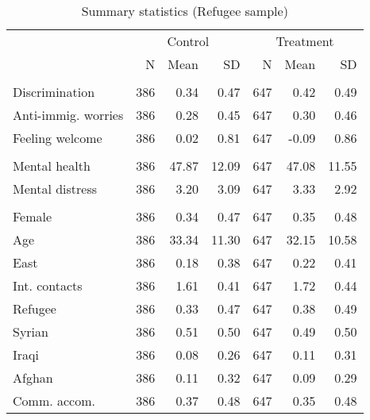 \begin{table}[H]

\caption{Summary statistics (Refugee sample) \label{tab_summary_refugee}}
\centering
\fontsize{10}{12}\selectfont
\begin{tabular}[t]{lrrrrrr}
\toprule
\multicolumn{1}{c}{ } & \multicolumn{3}{c}{Control} & \multicolumn{3}{c}{Treatment} \\
\cmidrule(l{3pt}r{3pt}){2-4} \cmidrule(l{3pt}r{3pt}){5-7}
  & N & Mean & SD & N & Mean & SD\\
\midrule
\addlinespace[0.3em]
\multicolumn{7}{l}{\textbf{Hostility}}\\
\hspace{1em}Discrimination & 386 & 0.34 & 0.47 & 647 & 0.42 & 0.49\\
\hspace{1em}Anti-immig. worries & 386 & 0.28 & 0.45 & 647 & 0.30 & 0.46\\
\hspace{1em}Feeling welcome & 386 & 0.02 & 0.81 & 647 & -0.09 & 0.86\\
\addlinespace[0.3em]
\multicolumn{7}{l}{\textbf{Well-being}}\\
\hspace{1em}Mental health & 386 & 47.87 & 12.09 & 647 & 47.08 & 11.55\\
\hspace{1em}Mental distress & 386 & 3.20 & 3.09 & 647 & 3.33 & 2.92\\
\addlinespace[0.3em]
\multicolumn{7}{l}{\textbf{Independent variables}}\\
\hspace{1em}Female & 386 & 0.34 & 0.47 & 647 & 0.35 & 0.48\\
\hspace{1em}Age & 386 & 33.34 & 11.30 & 647 & 32.15 & 10.58\\
\hspace{1em}East & 386 & 0.18 & 0.38 & 647 & 0.22 & 0.41\\
\hspace{1em}Int. contacts & 386 & 1.61 & 0.41 & 647 & 1.72 & 0.44\\
\hspace{1em}Refugee & 386 & 0.33 & 0.47 & 647 & 0.38 & 0.49\\
\hspace{1em}Syrian & 386 & 0.51 & 0.50 & 647 & 0.49 & 0.50\\
\hspace{1em}Iraqi & 386 & 0.08 & 0.26 & 647 & 0.11 & 0.31\\
\hspace{1em}Afghan & 386 & 0.11 & 0.32 & 647 & 0.09 & 0.29\\
\hspace{1em}Comm. accom. & 386 & 0.37 & 0.48 & 647 & 0.35 & 0.48\\
\bottomrule
\end{tabular}
\end{table}